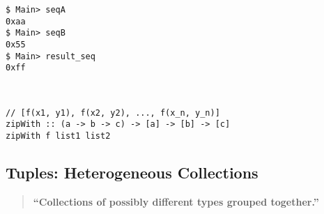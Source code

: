 \begin{lstlisting}[style=zsh]
$ Main> seqA
0xaa
$ Main> seqB
0x55
$ Main> result_seq
0xff
\end{lstlisting}
\begin{note}
\ \begin{lstlisting}[style=haskell]
// [f(x1, y1), f(x2, y2), ..., f(x_n, y_n)]
zipWith :: (a -> b -> c) -> [a] -> [b] -> [c]
zipWith f list1 list2
\end{lstlisting}
\end{note}

\subsection{Tuples: Heterogeneous Collections}
\begin{quote}\bf
``Collections of possibly different types grouped together.''
\end{quote}

